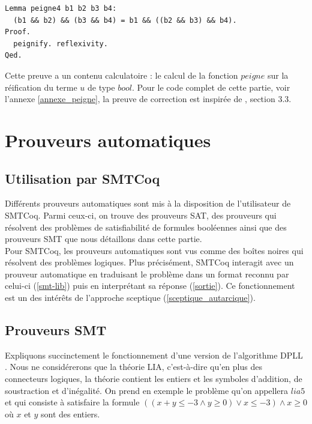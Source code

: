 \documentclass[11pt]{article}
\begin{document}
\begin{lstlisting}[frame=single]
Lemma peigne4 b1 b2 b3 b4:
  (b1 && b2) && (b3 && b4) = b1 && ((b2 && b3) && b4).
Proof.
  peignify. reflexivity.
Qed.
\end{lstlisting}
Cette preuve a un contenu calculatoire : le calcul de la fonction $peigne$ sur la réification du terme $u$ de type $bool$. Pour le code complet de cette partie, voir l'annexe \ref{annexe_peigne}, la preuve de correction est inspirée de \cite{coq_intro}, section 3.3.


\newpage
\section{Prouveurs automatiques} \label{fonctionnement_prouveurs}

\subsection{Utilisation par SMTCoq}

Différents prouveurs automatiques sont mis à la disposition de l'utilisateur de SMTCoq. Parmi ceux-ci, on trouve des prouveurs SAT, des prouveurs qui résolvent des problèmes de satisfiabilité de formules booléennes ainsi que des prouveurs SMT que nous détaillons dans cette partie. \\ 

Pour SMTCoq, les prouveurs automatiques sont vus comme des boîtes noires qui résolvent des problèmes logiques. Plus précisément, SMTCoq interagit avec un prouveur automatique en traduisant le problème dans un format reconnu par celui-ci (\ref{smt-lib}) puis en interprétant sa réponse (\ref{sortie}). Ce fonctionnement est un des intérêts de l'approche sceptique (\ref{sceptique_autarcique}).

\subsection{Prouveurs SMT} \label{smt}

Expliquons succinctement le fonctionnement d'une version de l'algorithme DPLL \cite{dpll}. Nous ne considérerons que la théorie LIA, c'est-à-dire qu'en plus des connecteurs logiques, la théorie contient les entiers et les symboles d'addition, de soustraction et d'inégalité. On prend en exemple le problème qu'on appellera $lia5$ et qui consiste à satisfaire la formule $((x + y \leq -3 \wedge y \geq 0) \vee x \leq -3) \wedge x \geq 0$ où $x$ et $y$ sont des entiers. \\
\end{document}
